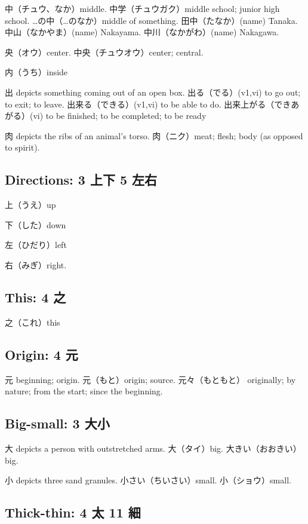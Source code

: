 中（チュウ、なか）middle.
中学（チュウガク）middle school; junior high school.
…の中（…のなか）middle of something.
田中（たなか）(name) Tanaka.
中山（なかやま）(name) Nakayama.
中川（なかがわ）(name) Nakagawa.

央（オウ）center.
中央（チュウオウ）center; central.

内（うち）inside

出 depicts something coming out of an open box.
出る（でる）(v1,vi) to go out; to exit; to leave.
出来る（できる）(v1,vi) to be able to do.
出来上がる（できあがる）(vi) to be finished; to be completed; to be ready

肉 depicts the ribs of an animal's torso.
肉（ニク）meat; flesh; body (as opposed to spirit).

\subsection{Directions: 3 上下 5 左右}

上（うえ）up

下（した）down

左（ひだり）left

右（みぎ）right.

\subsection{This: 4 之}

之（これ）this

\subsection{Origin: 4 元}

元 beginning; origin.
元（もと）origin; source.
元々（もともと）
originally; by nature; from the start; since the beginning.

\subsection{Big-small: 3 大小}

大 depicts a person with outstretched arms.
大（タイ）big.
大きい（おおきい）big.

小 depicts three sand granules.
小さい（ちいさい）small.
小（ショウ）small.

\subsection{Thick-thin: 4 太 11 細}

